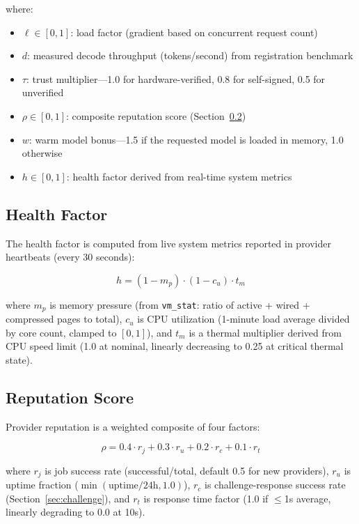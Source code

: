 \documentclass[10pt,twocolumn,letterpaper]{article}
\begin{document}
where:
\begin{itemize}[leftmargin=*,itemsep=1pt]
    \item $\ell \in [0,1]$: load factor (gradient based on concurrent request count)
    \item $d$: measured decode throughput (tokens/second) from registration benchmark
    \item $\tau$: trust multiplier---1.0 for hardware-verified, 0.8 for self-signed, 0.5 for unverified
    \item $\rho \in [0,1]$: composite reputation score (Section~\ref{sec:reputation})
    \item $w$: warm model bonus---1.5 if the requested model is loaded in memory, 1.0 otherwise
    \item $h \in [0,1]$: health factor derived from real-time system metrics
\end{itemize}

\subsection{Health Factor}

The health factor is computed from live system metrics reported in provider heartbeats (every 30 seconds):

\begin{equation}
h = (1 - m_p) \cdot (1 - c_u) \cdot t_m
\end{equation}

where $m_p$ is memory pressure (from \texttt{vm\_stat}: ratio of active + wired + compressed pages to total), $c_u$ is CPU utilization (1-minute load average divided by core count, clamped to $[0,1]$), and $t_m$ is a thermal multiplier derived from CPU speed limit (1.0 at nominal, linearly decreasing to 0.25 at critical thermal state).

\subsection{Reputation Score}
\label{sec:reputation}

Provider reputation is a weighted composite of four factors:

\begin{equation}
\rho = 0.4 \cdot r_j + 0.3 \cdot r_u + 0.2 \cdot r_c + 0.1 \cdot r_t
\end{equation}

where $r_j$ is job success rate (successful/total, default 0.5 for new providers), $r_u$ is uptime fraction ($\min(\text{uptime}/24\text{h}, 1.0)$), $r_c$ is challenge-response success rate (Section~\ref{sec:challenge}), and $r_t$ is response time factor (1.0 if $\leq$1s average, linearly degrading to 0.0 at 10s).
\end{document}
